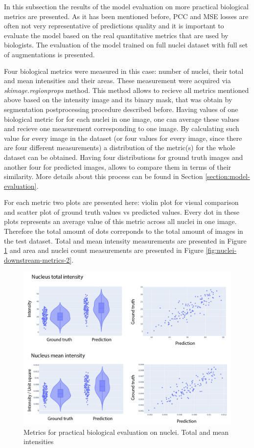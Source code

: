 In this subsection the results of the model evaluation on more practical biological metrics are presented. As it has been mentioned before, PCC and MSE losses are often not very representative of predictions quality and it is important to evaluate the model based on the real quantitative metrics that are used by biologists. The evaluation of the model trained on full nuclei dataset with full set of augmentations is presented. 

Four biological metrics were measured in this case: number of nuclei, their total and mean intensities and their areas. These measurement were acquired via \textit{skimage.regionprops} method. This method allows to recieve all metrics mentioned above based on the intensity image and its binary mask, that was obtain by segmentation postprocessing procedure described before. Having values of one biological metric for for each nuclei in one image, one can average these values and recieve one measurement corresponding to one image. By calculating such value for every image in the dataset (or four values for every image, since there are four different measurements) a distribution of the metric(s) for the whole dataset can be obtained. Having four distributions for ground truth images and another four for predicted images, allows to compare them in terms of their similarity. More details about this process can be found in Section \ref{section:model-evaluation}.

For each metric two plots are presented here: violin plot for visual comparison and scatter plot of ground truth values vs predicted values. Every dot in these plots represents an average value of this metric across all nuclei in one image. Therefore the total amount of dots correponds to the total amount of images in the test dataset. Total and mean intensity measurements are presented in Figure \ref{fig:nuclei-downstream-metrics-1} and area and nuclei count measurements are presented in Figure \ref{fig:nuclei-downstream-metrics-2}.

\begin{figure}[htb]
	\begin{center}
		\includegraphics[width=0.8\linewidth]{bilder/nuclei/metric/combined-metrics.png}
		\caption{Metrics for practical biological evaluation on nuclei. Total and mean intensities}\label{fig:nuclei-downstream-metrics-1}
	\end{center}
\end{figure}

